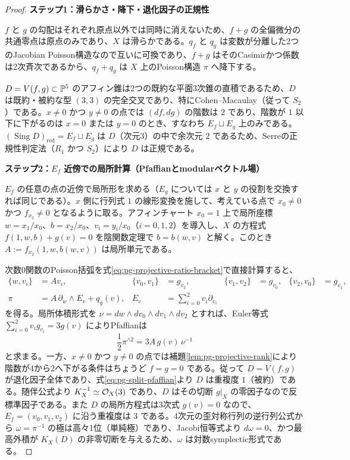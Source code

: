 \begin{proof}
\par\medskip\noindent\textbf{ステップ1：滑らかさ・降下・退化因子の正規性}\par\nobreak\smallskip
$f$ と $g$ の勾配はそれぞれ原点以外では同時に消えないため、$f+g$ の全偏微分の共通零点は原点のみであり、$X$ は滑らかである。$q_f$ と $q_g$ は変数が分離した2つのJacobian Poisson構造なので互いに可換であり、$f+g$ はそのCasimirかつ係数は2次斉次であるから、$q_f+q_g$ は $X$ 上のPoisson構造 $\pi$ へ降下する。

$D=V(f,g)\subset\mathbb P^5$ のアフィン錐は2つの既約な平面3次錐の直積であるため、$D$ は既約・被約な型 $(3,3)$ の完全交叉であり、特にCohen--Macaulay（従って $S_2$）である。$x\ne0$ かつ $y\ne0$ の点では $(df,dg)$ の階数は $2$ であり、階数が $1$ 以下に下がるのは $x=0$ または $y=0$ のとき、すなわち $E_f\sqcup E_g$ 上のみである。$(\operatorname{Sing}D)_{\mathrm{red}}=E_f\sqcup E_g$ は $D$（次元3）の中で余次元 $2$ であるため、Serreの正規性判定法（$R_1$ かつ $S_2$）により $D$ は正規である。

\par\medskip\noindent\textbf{ステップ2：$E_f$ 近傍での局所計算（Pfaffianとmodularベクトル場）}\par\nobreak\smallskip
$E_f$ の任意の点の近傍で局所形を求める（$E_g$ については $x$ と $y$ の役割を交換すれば同じである）。$x$ 側に行列式 $1$ の線形変換を施して、考えている点で $x_0\ne0$ かつ $f_{x_2}\ne0$ となるように取る。アフィンチャート $x_0=1$ 上で局所座標 $w=x_1/x_0$、$b=x_2/x_0$、$v_i=y_i/x_0$（$i=0,1,2$）を導入し、$X$ の方程式 $f(1,w,b)+g(v)=0$ を陰関数定理で $b=b(w,v)$ と解く。このとき $A:=f_{x_2}(1,w,b(w,v))$ は局所単元である。

次数0関数のPoisson括弧を式\eqref{eq:pg-projective-ratio-bracket}で直接計算すると、
\begin{equation}
\begin{aligned}
\{w,v_i\}&=A v_i,&
\{v_0,v_1\}&=g_{v_2},&
\{v_1,v_2\}&=g_{v_0},&
\{v_2,v_0\}&=g_{v_1},\\
\pi&=A\,\partial_w\wedge E_v+q_g(v),&
E_v&=\sum_{i=0}^2v_i\partial_{v_i}
\end{aligned}
\label{eq:pg-split-local-poisson}
\end{equation}
を得る。局所体積形式を $\nu=dw\wedge dv_0\wedge dv_1\wedge dv_2$ とすれば、Euler等式 $\sum_{i=0}^2 v_i g_{v_i}=3g(v)$ によりPfaffianは
\begin{equation}
\frac12\pi^{\wedge2}=3A\,g(v)\,\nu^{-1}
\label{eq:pg-split-pfaffian}
\end{equation}
と求まる。一方、$x\ne0$ かつ $y\ne0$ の点では補題\ref{lem:pg-projective-rank}により階数が4から2へ下がる条件はちょうど $f=g=0$ である。従って $D=V(f,g)$ が退化因子全体であり、式\eqref{eq:pg-split-pfaffian}より $D$ は重複度 $1$（被約）である。随伴公式より $K_X^{-1}\simeq\mathcal O_X(3)$ であり、$D$ はその切断 $g|_X$ の零因子なので反標準因子である。また $D$ の局所方程式は3次式 $g(v)=0$ なので、$E_f=(v_0,v_1,v_2)$ に沿う重複度は $3$ である。4次元の歪対称行列の逆行列公式から $\omega=\pi^{-1}$ の極は高々1位（単純極）であり、Jacobi恒等式より $d\omega=0$、かつ最高外積が $K_X(D)$ の非零切断を与えるため、$\omega$ は対数symplectic形式である。


\end{proof}
